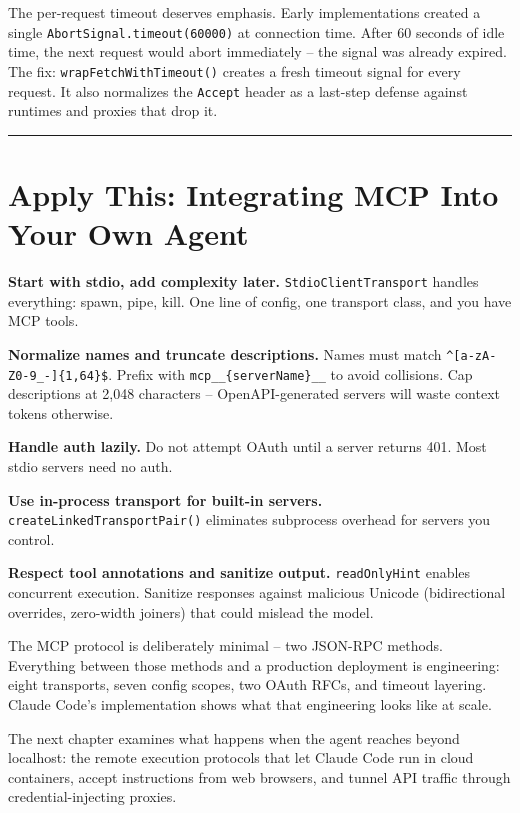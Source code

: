 \documentclass[
  english,
  11pt,
  letterpaper,
]{book}
\begin{document}
The per-request timeout deserves emphasis. Early implementations created
a single \texttt{AbortSignal.timeout(60000)} at connection time. After
60 seconds of idle time, the next request would abort immediately -- the
signal was already expired. The fix: \texttt{wrapFetchWithTimeout()}
creates a fresh timeout signal for every request. It also normalizes the
\texttt{Accept} header as a last-step defense against runtimes and
proxies that drop it.

\begin{center}\rule{0.5\linewidth}{0.5pt}\end{center}

\section{Apply This: Integrating MCP Into Your Own
Agent}\label{apply-this-integrating-mcp-into-your-own-agent}

\textbf{Start with stdio, add complexity later.}
\texttt{StdioClientTransport} handles everything: spawn, pipe, kill. One
line of config, one transport class, and you have MCP tools.

\textbf{Normalize names and truncate descriptions.} Names must match
\texttt{\^{}{[}a-zA-Z0-9\_-{]}\{1,64\}\$}. Prefix with
\texttt{mcp\_\_\{serverName\}\_\_} to avoid collisions. Cap descriptions
at 2,048 characters -- OpenAPI-generated servers will waste context
tokens otherwise.

\textbf{Handle auth lazily.} Do not attempt OAuth until a server returns
401. Most stdio servers need no auth.

\textbf{Use in-process transport for built-in servers.}
\texttt{createLinkedTransportPair()} eliminates subprocess overhead for
servers you control.

\textbf{Respect tool annotations and sanitize output.}
\texttt{readOnlyHint} enables concurrent execution. Sanitize responses
against malicious Unicode (bidirectional overrides, zero-width joiners)
that could mislead the model.

The MCP protocol is deliberately minimal -- two JSON-RPC methods.
Everything between those methods and a production deployment is
engineering: eight transports, seven config scopes, two OAuth RFCs, and
timeout layering. Claude Code's implementation shows what that
engineering looks like at scale.

The next chapter examines what happens when the agent reaches beyond
localhost: the remote execution protocols that let Claude Code run in
cloud containers, accept instructions from web browsers, and tunnel API
traffic through credential-injecting proxies.
\end{document}

